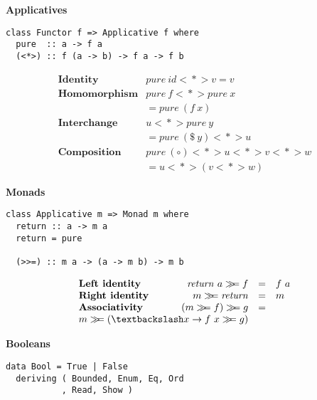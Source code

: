 \begin{multicols}{2}
\textbf{\large Applicatives}\\
	
\begin{verbatim}
class Functor f => Applicative f where 
  pure  :: a -> f a
  (<*>) :: f (a -> b) -> f a -> f b
\end{verbatim}
\begin{displaymath}
\begin{array}{lr}
\textbf{Identity} & \mathit{pure}~\mathit{id} <\!\!*\!\!> v = v \\ 
\textbf{Homomorphism} & \mathit{pure}~f <\!\!*\!\!> \mathit{pure}~x \\& = \mathit{pure}~(f~x) \\
\textbf{Interchange} & u <\!\!*\!\!> \mathit{pure}~y \\
& = \mathit{pure}~(\$~y) <\!\!*\!\!> u \\
\textbf{Composition} & \mathit{pure}~(\circ) <\!\!*\!\!> u <\!\!*\!\!> v <\!\!*\!\!> w  \\
& = u <\!\!*\!\!> (v <\!\!*\!\!> w)
\end{array}
\end{displaymath}
	
\textbf{\large Monads}\\
	
\begin{verbatim}
class Applicative m => Monad m where 
  return :: a -> m a
  return = pure

  (>>=) :: m a -> (a -> m b) -> m b
\end{verbatim}
\begin{displaymath}
\begin{array}{lrcl}
\textbf{Left identity} & \mathit{return}~a \bind f & = & f~a \\
\textbf{Right identity} & m \bind \mathit{return} & = & m \\
\textbf{Associativity} & (m \bind f) \bind g & = & \\ \multicolumn{2}{r}{ m \bind (\textbackslash x \to f~x \bind g)}
\end{array}
\end{displaymath}
	
\pagebreak
\textbf{\large Booleans}\\
	
\begin{verbatim}
data Bool = True | False
  deriving ( Bounded, Enum, Eq, Ord
           , Read, Show )
\end{verbatim}
	

\end{multicols}
